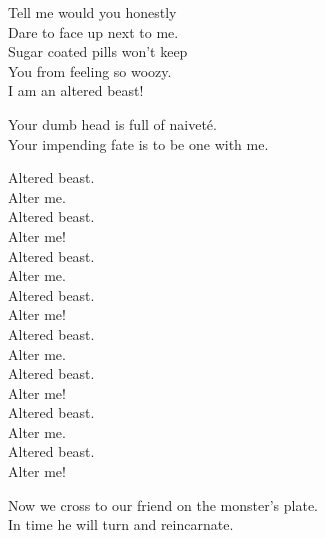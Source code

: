 
Tell me would you honestly \\
Dare to face up next to me. \\
Sugar coated pills won't keep \\
You from feeling so woozy. \\

I am an altered beast! \\





Your dumb  head is full of naiveté. \\
Your impending fate is to be one with me. \\


Altered beast. \\
Alter me. \\
Altered beast. \\
Alter me! \\

Altered beast. \\
Alter me. \\
Altered beast. \\
Alter me! \\

Altered beast. \\
Alter me. \\
Altered beast. \\
Alter me! \\

Altered beast. \\
Alter me. \\
Altered beast. \\
Alter me! \\


Now we cross to our friend on the monster's plate. \\
In time he will turn and reincarnate. \\




